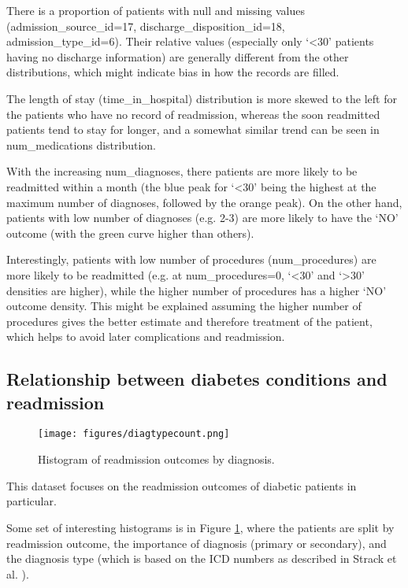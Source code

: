 \documentclass[10pt, twocolumn]{article}
\begin{document}
There is a proportion of patients with null and missing values (admission\_source\_id=17, discharge\_disposition\_id=18, admission\_type\_id=6). Their relative values (especially only `<30' patients having no discharge information) are generally different from the other distributions, which might indicate bias in how the records are filled.

The length of stay (time\_in\_hospital) distribution is more skewed to the left for the patients who have no record of readmission, whereas the soon readmitted patients tend to stay for longer, and a somewhat similar trend can be seen in num\_medications distribution.

With the increasing num\_diagnoses, there patients are more likely to be readmitted within a month (the blue peak for `<30' being the highest at the maximum number of diagnoses, followed by the orange peak). On the other hand, patients with low number of diagnoses (e.g. 2-3) are more likely to have the `NO' outcome (with the green curve higher than others).

Interestingly, patients with low number of procedures (num\_procedures) are more likely to be readmitted (e.g. at num\_procedures=0, `<30' and `>30' densities are higher), while the higher number of procedures has a higher `NO' outcome density. This might be explained assuming the higher number of procedures gives the better estimate and therefore treatment of the patient, which helps to avoid later complications and readmission.

\subsection{Relationship between diabetes conditions and readmission}

\begin{figure}[htb!]
	\centering
	\texttt{[image: figures/diagtypecount.png]}
	\caption{Histogram of readmission outcomes by diagnosis.}\label{diag}
\end{figure}

This dataset focuses on the readmission outcomes of diabetic patients in particular.

Some set of interesting histograms is in Figure \ref{diag}, where the patients are split by readmission outcome, the importance of diagnosis (primary or secondary), and the diagnosis type (which is based on the ICD numbers as described in Strack et al. \cite{strack2014dataset}). 
\end{document}
